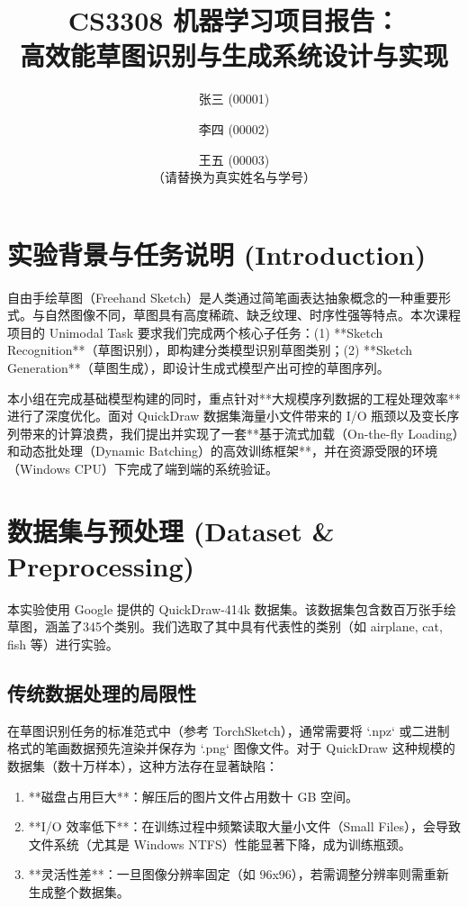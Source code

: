 \documentclass{sjtuarticle}
\title{CS3308 机器学习项目报告：\\高效能草图识别与生成系统设计与实现}
\author{张三 (00001) \and 李四 (00002) \and 王五 (00003) \\ （请替换为真实姓名与学号）}
\begin{document}
\maketitle

\section{实验背景与任务说明 (Introduction)}

自由手绘草图（Freehand Sketch）是人类通过简笔画表达抽象概念的一种重要形式。与自然图像不同，草图具有高度稀疏、缺乏纹理、时序性强等特点。本次课程项目的 Unimodal Task 要求我们完成两个核心子任务：(1) **Sketch Recognition**（草图识别），即构建分类模型识别草图类别；(2) **Sketch Generation**（草图生成），即设计生成式模型产出可控的草图序列。

本小组在完成基础模型构建的同时，重点针对**大规模序列数据的工程处理效率**进行了深度优化。面对 QuickDraw 数据集海量小文件带来的 I/O 瓶颈以及变长序列带来的计算浪费，我们提出并实现了一套**基于流式加载（On-the-fly Loading）和动态批处理（Dynamic Batching）的高效训练框架**，并在资源受限的环境（Windows CPU）下完成了端到端的系统验证。

\section{数据集与预处理 (Dataset \& Preprocessing)}

本实验使用 Google 提供的 QuickDraw-414k 数据集。该数据集包含数百万张手绘草图，涵盖了345个类别。我们选取了其中具有代表性的类别（如 airplane, cat, fish 等）进行实验。

\subsection{传统数据处理的局限性}
在草图识别任务的标准范式中（参考 TorchSketch），通常需要将 `.npz` 或二进制格式的笔画数据预先渲染并保存为 `.png` 图像文件。对于 QuickDraw 这种规模的数据集（数十万样本），这种方法存在显著缺陷：
\begin{enumerate}
    \item **磁盘占用巨大**：解压后的图片文件占用数十 GB 空间。
    \item **I/O 效率低下**：在训练过程中频繁读取大量小文件（Small Files），会导致文件系统（尤其是 Windows NTFS）性能显著下降，成为训练瓶颈。
    \item **灵活性差**：一旦图像分辨率固定（如 96x96），若需调整分辨率则需重新生成整个数据集。
\end{enumerate}
\end{document}
